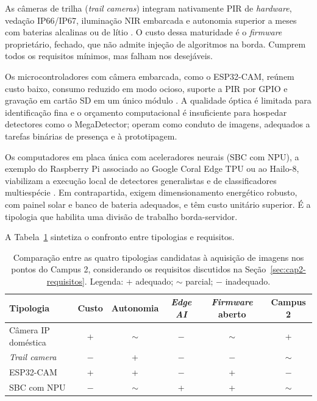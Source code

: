 As câmeras de trilha (\textit{trail cameras}) integram nativamente PIR de \textit{hardware}, vedação IP66/IP67, iluminação NIR embarcada e autonomia superior a meses com baterias alcalinas ou de lítio \cite{bruce2025largescale,cordier2022africa,swanson2015snapshot}. O custo dessa maturidade é o \textit{firmware} proprietário, fechado, que não admite injeção de algoritmos na borda. Cumprem todos os requisitos mínimos, mas falham nos desejáveis.


Os microcontroladores com câmera embarcada, como o ESP32-CAM, reúnem custo baixo, consumo reduzido em modo ocioso, suporte a PIR por GPIO e gravação em cartão SD em um único módulo \cite{velasco2024smartcameratraps}. A qualidade óptica é limitada para identificação fina e o orçamento computacional é insuficiente para hospedar detectores como o MegaDetector; operam como conduto de imagens, adequados a tarefas binárias de presença e à prototipagem.


Os computadores em placa única com aceleradores neurais (SBC com NPU), a exemplo do Raspberry Pi associado ao Google Coral Edge TPU ou ao Hailo-8, viabilizam a execução local de detectores generalistas e de classificadores multiespécie \cite{sargent2021raspberrypi,tiddeman2023lowpowerhardware,pishdast2025smartcameratraps,mulero2025addressing}. Em contrapartida, exigem dimensionamento energético robusto, com painel solar e banco de bateria adequados, e têm custo unitário superior. É a tipologia que habilita uma divisão de trabalho borda-servidor.


A Tabela~\ref{tab:tipologias-comparativo} sintetiza o confronto entre tipologias e requisitos.


\begin{table}[!htb]
  \centering
  \caption[Comparação entre as quatro tipologias de câmera.]
  {Comparação entre as quatro tipologias candidatas à aquisição de imagens nos pontos do Campus 2, considerando os requisitos discutidos na Seção~\ref{sec:cap2-requisitos}. Legenda: + adequado; $\sim$ parcial; $-$ inadequado.}
  \label{tab:tipologias-comparativo}
  \small
  \begin{tabular}{@{}lccccc@{}}
    \hline
    Tipologia              & Custo  & Autonomia & \textit{Edge AI} & \textit{Firmware} aberto & Campus 2 \\
    \hline
    Câmera IP doméstica    & +      & $\sim$    & $-$              & $\sim$                   & +        \\
    \textit{Trail camera}  & $-$    & +         & $-$              & $-$                      & $\sim$   \\
    ESP32-CAM              & +      & +         & $-$              & +                        & $-$      \\
    SBC com NPU            & $-$    & $\sim$    & +                & +                        & $\sim$   \\
    \hline
  \end{tabular}
\end{table}


